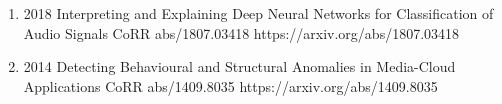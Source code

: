 \documentclass[10pt,a4paper]{article} %
\begin{document}
{\begin{enumerate}
        \item[] 
                            {2018}
                            {Interpreting and Explaining Deep Neural Networks for Classification of Audio Signals}
                            {CoRR abs/1807.03418}
                            {https://arxiv.org/abs/1807.03418}

        \item[] 
                            {2014}
                            {Detecting Behavioural and Structural Anomalies in Media-Cloud Applications}
                            {CoRR abs/1409.8035}
                            {https://arxiv.org/abs/1409.8035}

    \end{enumerate}

}
\end{document}
